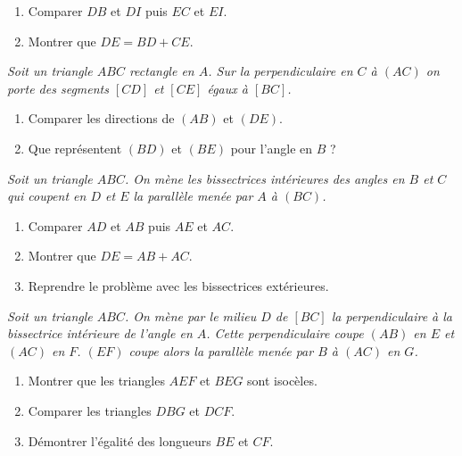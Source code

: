 \begin{itemize}
\begin{enumerate}
\item Comparer $DB$ et $DI$ puis $EC$ et $EI$.
\item Montrer que $DE=BD+CE$. 
\end{enumerate}
\it Soit un triangle $ABC$ rectangle en $A$. Sur la perpendiculaire en $C$ à $(AC)$ on porte des segments $[CD]$ et $[CE]$ égaux à $[BC]$.\begin{enumerate}
\item Comparer les directions de $(AB)$ et $(DE)$.
\item Que représentent $(BD)$ et $(BE)$ pour l'angle en $B$ ? 
\end{enumerate}
\it Soit un triangle $ABC$. On mène les bissectrices intérieures des angles en $B$ et $C$ qui coupent en $D$ et $E$ la parallèle menée par $A$ à $(BC)$. \begin{enumerate}
\item Comparer $AD$ et $AB$ puis $AE$ et $AC$.
\item Montrer que $DE=AB+AC$.
\item Reprendre le problème avec les bissectrices extérieures.
\end{enumerate}
\it Soit un triangle $ABC$. On mène par le milieu $D$ de $[BC]$ la perpendiculaire à la bissectrice intérieure de l'angle en $A$. Cette perpendiculaire coupe $(AB)$ en $E$ et $(AC)$ en $F$. $(EF)$ coupe alors la parallèle menée par $B$ à $(AC)$ en $G$. 
\begin{enumerate}
\item Montrer que les triangles $AEF$ et $BEG$ sont isocèles.
\item Comparer les triangles $DBG$ et $DCF$. 
\item Démontrer l'égalité des longueurs $BE$ et $CF$.
\end{enumerate}



\end{itemize}